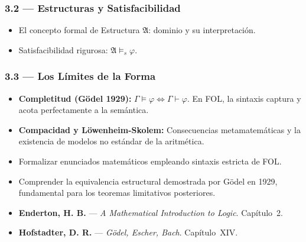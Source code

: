\documentclass[11pt, letterpaper]{article}
\begin{document}
\subsubsection{3.2 --- Estructuras y Satisfacibilidad}
\begin{itemize}
  \item El concepto formal de Estructura $\mathfrak{A}$: dominio y su interpretaci\'on.
  \item Satisfacibilidad rigurosa: $\mathfrak{A}\models_s\varphi$.
\end{itemize}

\subsubsection{3.3 --- Los L\'imites de la Forma}
\begin{itemize}
  \item \textbf{Completitud (G\"odel 1929):} $\Gamma\models\varphi \Leftrightarrow \Gamma\vdash\varphi$. En FOL, la sintaxis captura y acota perfectamente a la sem\'antica.
  \item \textbf{Compacidad y L\"owenheim-Skolem:} Consecuencias metamatem\'aticas y la existencia de modelos no est\'andar de la aritm\'etica.
\end{itemize}

\begin{objetivos}
\begin{itemize}
  \item Formalizar enunciados matem\'aticos empleando sintaxis estricta de FOL.
  \item Comprender la equivalencia estructural demostrada por G\"odel en 1929, fundamental para los teoremas limitativos posteriores.
\end{itemize}
\end{objetivos}

\begin{lecturas}
\begin{itemize}
  \item[$(\star)$] \textbf{Enderton, H. B.} --- \emph{A Mathematical Introduction to Logic}. Cap\'itulo~2.
  \item[$(\star)$] \textbf{Hofstadter, D. R.} --- \emph{G\"odel, Escher, Bach}. Cap\'itulo~XIV.
\end{itemize}
\end{lecturas}

\newpage

\end{document}
